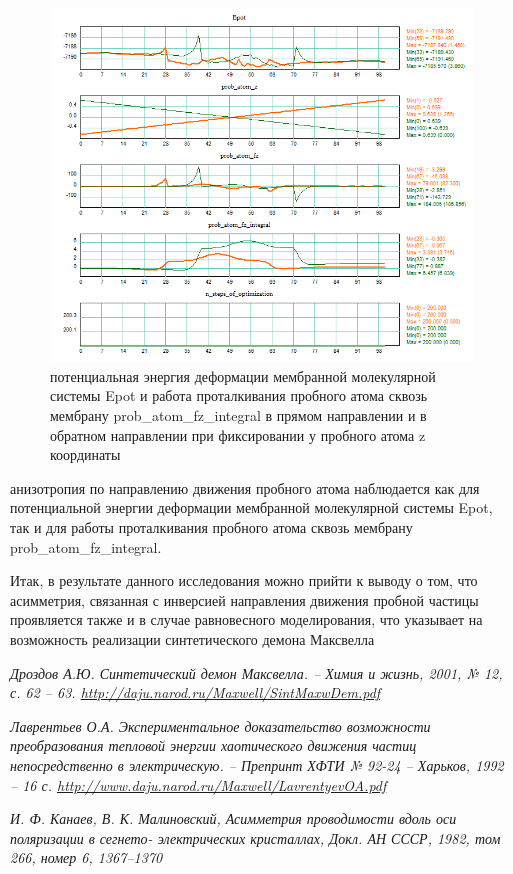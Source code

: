 \documentclass[12pt]{article}
\begin{document}
\begin{figure}
    \centering
    \includegraphics[scale=0.6]{./molecules/nanotrubki/12_0/work_6H_CN_He/5_plots_101_nstep=200_fix_z.png}
    \caption{потенциальная энергия деформации мембранной молекулярной системы Epot и работа проталкивания пробного атома сквозь мембрану prob\_atom\_fz\_integral в прямом направлении и в обратном направлении при фиксировании у пробного атома z координаты}
    \label{fig:frame_center}
\end{figure}


анизотропия по направлению движения пробного атома наблюдается как для потенциальной энергии деформации мембранной молекулярной системы Epot, так и для работы проталкивания пробного атома сквозь мембрану prob\_atom\_fz\_integral. 

Итак, в результате данного исследования можно прийти к выводу о том, что асимметрия, связанная с инверсией направления движения пробной частицы проявляется также и в случае равновесного моделирования, что указывает на возможность реализации синтетического демона Максвелла


\begin{thebibliography}{99}

\textit{ Дроздов А.Ю. Синтетический демон Максвелла. – Химия и жизнь, 2001, № 12, с. 62 – 63. \url{http://daju.narod.ru/Maxwell/SintMaxwDem.pdf} }

\textit{ Лаврентьев О.А. Экспериментальное доказательство возможности преобразования тепловой энергии хаотического движения частиц непосредственно в электрическую. – Препринт ХФТИ № 92-24 – Харьков, 1992 – 16 с. \url{http://www.daju.narod.ru/Maxwell/LavrentyevOA.pdf} }

\textit{И. Ф. Канаев, В. К. Малиновский, Асимметрия
проводимости вдоль оси поляризации в сегнето-
электрических кристаллах, Докл. АН СССР, 1982,
том 266, номер 6, 1367–1370}

\end{thebibliography}
\end{document}
